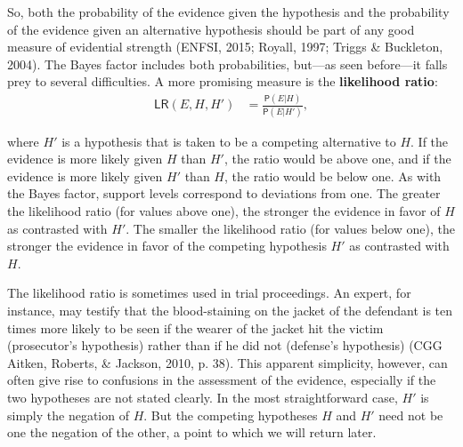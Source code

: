 \documentclass[
  10pt,
  dvipsnames,enabledeprecatedfontcommands]{scrartcl}
\newcommand{\pr}[1]{\mathsf{P}(#1)}
\begin{document}
So, both the probability of the evidence given the hypothesis and the
probability of the evidence given an alternative hypothesis should be
part of any good measure of evidential strength (ENFSI, 2015; Royall,
1997; Triggs \& Buckleton, 2004). The Bayes factor includes both
probabilities, but---as seen before---it falls prey to several
difficulties. A more promising measure is the \textbf{likelihood ratio}:
\begin{align}
\label{eq:LR}
\tag{LR}
\mathsf{LR}(E,H,H') & = \frac{\pr{E \vert H}}{\pr{E \vert H'}},
\end{align}

\noindent where \(H'\) is a hypothesis that is taken to be a competing
alternative to \(H\). If the evidence is more likely given \(H\) than
\(H'\), the ratio would be above one, and if the evidence is more likely
given \(H'\) than \(H\), the ratio would be below one. As with the Bayes
factor, support levels correspond to deviations from one. The greater
the likelihood ratio (for values above one), the stronger the evidence
in favor of \(H\) as contrasted with \(H'\). The smaller the likelihood
ratio (for values below one), the stronger the evidence in favor of the
competing hypothesis \(H'\) as contrasted with \(H\).

The likelihood ratio is sometimes used in trial proceedings. An expert,
for instance, may testify that the blood-staining on the jacket of the
defendant is ten times more likely to be seen if the wearer of the
jacket hit the victim (prosecutor's hypothesis) rather than if he did
not (defense's hypothesis) (CGG Aitken, Roberts, \& Jackson, 2010, p.
38). This apparent simplicity, however, can often give rise to
confusions in the assessment of the evidence, especially if the two
hypotheses are not stated clearly. In the most straightforward case,
\(H'\) is simply the negation of \(H\). But the competing hypotheses
\(H\) and \(H'\) need not be one the negation of the other, a point to
which we will return later.
\end{document}
